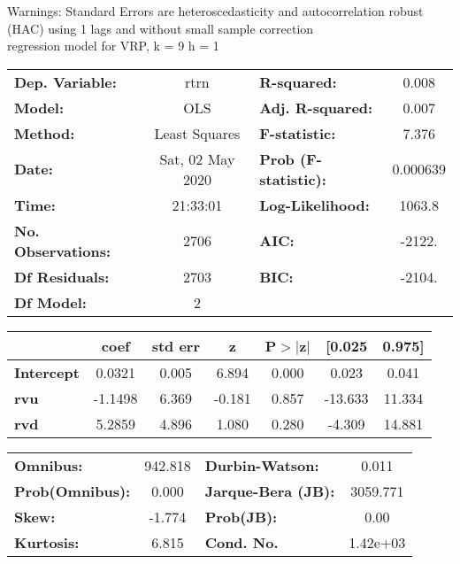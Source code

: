 Warnings: \newline
 [1] Standard Errors are heteroscedasticity and autocorrelation robust (HAC) using 1 lags and without small sample correction\\ 

regression model for VRP, k = 9 h = 1\begin{center}
\begin{tabular}{lclc}
\toprule
\textbf{Dep. Variable:}    &       rtrn       & \textbf{  R-squared:         } &     0.008   \\
\textbf{Model:}            &       OLS        & \textbf{  Adj. R-squared:    } &     0.007   \\
\textbf{Method:}           &  Least Squares   & \textbf{  F-statistic:       } &     7.376   \\
\textbf{Date:}             & Sat, 02 May 2020 & \textbf{  Prob (F-statistic):} &  0.000639   \\
\textbf{Time:}             &     21:33:01     & \textbf{  Log-Likelihood:    } &    1063.8   \\
\textbf{No. Observations:} &        2706      & \textbf{  AIC:               } &    -2122.   \\
\textbf{Df Residuals:}     &        2703      & \textbf{  BIC:               } &    -2104.   \\
\textbf{Df Model:}         &           2      & \textbf{                     } &             \\
\bottomrule
\end{tabular}
\begin{tabular}{lcccccc}
                   & \textbf{coef} & \textbf{std err} & \textbf{z} & \textbf{P$> |$z$|$} & \textbf{[0.025} & \textbf{0.975]}  \\
\midrule
\textbf{Intercept} &       0.0321  &        0.005     &     6.894  &         0.000        &        0.023    &        0.041     \\
\textbf{rvu}       &      -1.1498  &        6.369     &    -0.181  &         0.857        &      -13.633    &       11.334     \\
\textbf{rvd}       &       5.2859  &        4.896     &     1.080  &         0.280        &       -4.309    &       14.881     \\
\bottomrule
\end{tabular}
\begin{tabular}{lclc}
\textbf{Omnibus:}       & 942.818 & \textbf{  Durbin-Watson:     } &    0.011  \\
\textbf{Prob(Omnibus):} &   0.000 & \textbf{  Jarque-Bera (JB):  } & 3059.771  \\
\textbf{Skew:}          &  -1.774 & \textbf{  Prob(JB):          } &     0.00  \\
\textbf{Kurtosis:}      &   6.815 & \textbf{  Cond. No.          } & 1.42e+03  \\
\bottomrule
\end{tabular}
\end{center}

